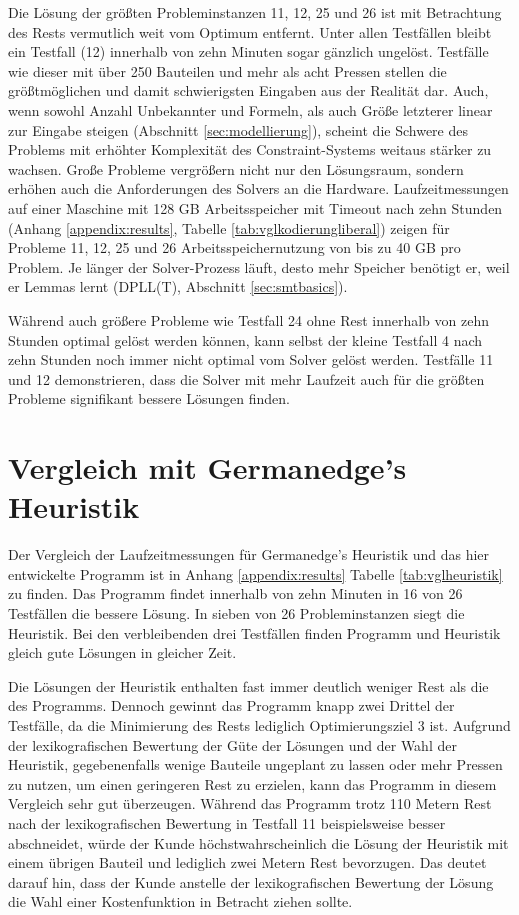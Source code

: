 Die Lösung der größten Probleminstanzen 11, 12, 25 und 26 ist mit Betrachtung des Rests vermutlich weit vom Optimum entfernt.
Unter allen Testfällen bleibt ein Testfall (12) innerhalb von zehn Minuten sogar gänzlich ungelöst.
Testfälle wie dieser mit über 250 Bauteilen und mehr als acht Pressen stellen die größtmöglichen und damit schwierigsten Eingaben aus der Realität dar.
Auch, wenn sowohl Anzahl Unbekannter und Formeln, als auch Größe letzterer linear zur Eingabe steigen (Abschnitt \ref{sec:modellierung}),
scheint die Schwere des Problems mit erhöhter Komplexität des Constraint-Systems weitaus stärker zu wachsen.
Große Probleme vergrößern nicht nur den Lösungsraum, sondern erhöhen auch die Anforderungen des Solvers an die Hardware.
Laufzeitmessungen auf einer Maschine mit 128 GB Arbeitsspeicher mit Timeout nach zehn Stunden (Anhang \ref{appendix:results}, Tabelle \ref{tab:vglkodierungliberal}) zeigen für Probleme
11, 12, 25 und 26 Arbeitsspeichernutzung von bis zu 40 GB pro Problem.
Je länger der Solver-Prozess läuft, desto mehr Speicher benötigt er, weil er Lemmas lernt (DPLL(T), Abschnitt \ref{sec:smtbasics}).

Während auch größere Probleme wie Testfall 24 ohne Rest innerhalb von zehn Stunden optimal gelöst werden können, kann selbst der kleine Testfall 4 nach zehn Stunden
noch immer nicht optimal vom Solver gelöst werden.
Testfälle 11 und 12 demonstrieren, dass die Solver mit mehr Laufzeit auch für die größten Probleme signifikant bessere Lösungen finden.

\section{Vergleich mit Germanedge's Heuristik}
Der Vergleich der Laufzeitmessungen für Germanedge's Heuristik und das hier entwickelte Programm ist in Anhang \ref{appendix:results} Tabelle \ref{tab:vglheuristik} zu finden.
Das Programm findet innerhalb von zehn Minuten in 16 von 26 Testfällen die bessere Lösung.
In sieben von 26 Probleminstanzen siegt die Heuristik.
Bei den verbleibenden drei Testfällen finden Programm und Heuristik gleich gute Lösungen in gleicher Zeit.

Die Lösungen der Heuristik enthalten fast immer deutlich weniger Rest als die des Programms.
Dennoch gewinnt das Programm knapp zwei Drittel der Testfälle, da die Minimierung des Rests lediglich Optimierungsziel 3 ist.
Aufgrund der lexikografischen Bewertung der Güte der Lösungen und der Wahl der Heuristik, gegebenenfalls wenige Bauteile ungeplant zu lassen oder mehr Pressen zu nutzen,
um einen geringeren Rest zu erzielen, kann das Programm in diesem Vergleich sehr gut überzeugen.
Während das Programm trotz 110 Metern Rest nach der lexikografischen Bewertung in Testfall 11 beispielsweise besser abschneidet, würde der Kunde höchstwahrscheinlich die
Lösung der Heuristik mit einem übrigen Bauteil und lediglich zwei Metern Rest bevorzugen.
Das deutet darauf hin, dass der Kunde anstelle der lexikografischen Bewertung der Lösung die Wahl einer Kostenfunktion in Betracht ziehen sollte.

